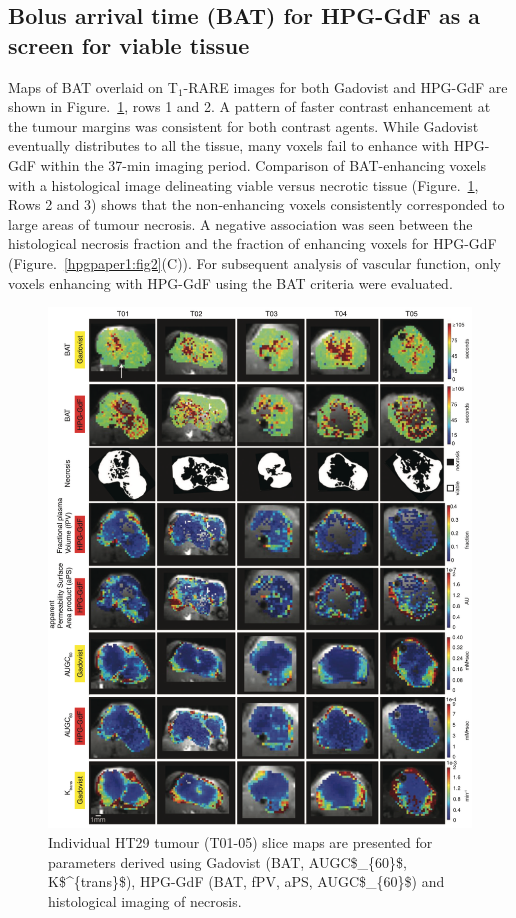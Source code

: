 \subsection{Bolus arrival time (BAT) for \acs{HPG-GdF} as a screen for viable tissue}

Maps of \acs{BAT} overlaid on T$_1$-RARE images for both Gadovist and \acs{HPG-GdF} are shown in Figure.~\ref{hpgpaper1:fig4}, rows 1 and 2.
A pattern of faster contrast enhancement at the tumour margins was consistent for both contrast agents.
While Gadovist eventually distributes to all the tissue, many voxels fail to enhance with \acs{HPG-GdF} within the 37-min imaging period.
Comparison of \acs{BAT}-enhancing voxels with a histological image delineating viable versus necrotic tissue (Figure.~\ref{hpgpaper1:fig4}, Rows 2 and 3) shows that the non-enhancing voxels consistently corresponded to large areas of tumour necrosis.
A negative association was seen between the histological necrosis fraction and the fraction of enhancing voxels for \acs{HPG-GdF} (Figure.~\ref{hpgpaper1:fig2}(C)).
For subsequent analysis of vascular function, only voxels enhancing with \acs{HPG-GdF} using the \acs{BAT} criteria were evaluated.

\begin{figure}[htbp]
 \includegraphics[width=\textwidth]{hpg/hpg-paper1-images/hpg_fig4-ht29.png}
 \caption{Individual HT29 tumour (T01-05) slice maps are presented for parameters derived using Gadovist (\acs{BAT}, \acs{AUGC$_{60}$}, \acs{K$^{trans}$}), \acs{HPG-GdF} (\acs{BAT}, \acs{fPV}, \acs{aPS}, \acs{AUGC$_{60}$}) and histological imaging of necrosis.}
 \label{hpgpaper1:fig4}
\end{figure}

